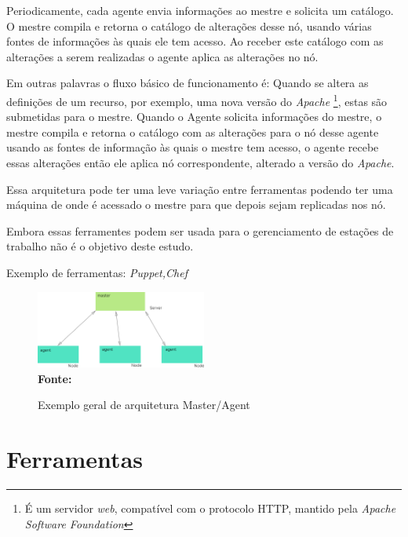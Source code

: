  Periodicamente, cada agente envia informações ao mestre e solicita um catálogo. O mestre compila e retorna o catálogo de alterações desse nó, usando várias fontes de informações às quais ele tem acesso. Ao receber este catálogo com as alterações a serem realizadas o agente aplica as alterações no nó. 
 
 Em outras palavras o fluxo básico de funcionamento é: Quando se altera as definições de um recurso, por exemplo, uma nova versão do \textit{Apache} \footnote{É um servidor \textit{web}, compatível com o protocolo HTTP, mantido pela \textit{Apache Software Foundation }}, estas são submetidas para o mestre. Quando o Agente solicita informações do mestre, o mestre compila e retorna o catálogo com as alterações para o nó desse agente usando as fontes de informação às quais o mestre tem acesso, o agente recebe essas alterações então ele aplica nó correspondente, alterado a versão do \textit{Apache}.   

Essa arquitetura pode ter uma leve variação entre ferramentas podendo ter uma máquina de onde é acessado o mestre para que depois sejam replicadas nos nó.

Embora essas ferramentes podem ser usada para o gerenciamento de estações de trabalho não é o objetivo deste estudo.

Exemplo de ferramentas: \textit{Puppet,Chef} 

 \begin{figure}[ht]
	\centering	
	\caption[\hspace{0.1cm}Exemplo arquitetura Master/Agent]{Exemplo geral de arquitetura Master/Agent}
	\vspace{-0.4cm}
	\includegraphics[width=0.5\textwidth]{figuras/master-agent.png}
	 \vspace{-0.2cm}
	\\\textbf{\footnotesize Fonte: \cite{Harit}}
	\label{fig:figura4}
\end{figure}
\vspace{-0.5cm}

\section{Ferramentas}

 
  
 


 